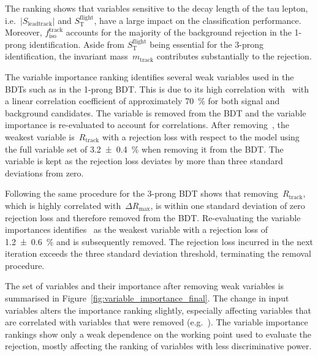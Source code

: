 The ranking shows that variables sensitive to the decay length of the tau
lepton, i.e.\ $|S_\text{leadtrack}|$ and $S_\text{T}^\text{flight}$, have a
large impact on the classification performance. Moreover,
$f_\text{iso}^\text{track}$ accounts for the majority of the background
rejection in the 1-prong identification. Aside from $S_\text{T}^\text{flight}$
being essential for the 3-prong identification, the invariant
mass~$m_\text{track}$ contributes substantially to the rejection.

The variable importance ranking identifies several weak variables used in the
BDTs such as  in the 1-prong BDT. This is
due to its high correlation
with~ with a linear correlation
coefficient of approximately \SI{70}{\percent} for both signal and background
\tauhadvis candidates. The variable is removed from the BDT and the variable
importance is re-evaluated to account for correlations. After
removing~, the weakest variable
is~$R_\text{track}$ with a rejection loss with respect to the model using the
full variable set of \SI{3.2 +- 0.4}{\percent} when removing it from the BDT.
The variable is kept as the rejection loss deviates by more than three standard
deviations from zero.

Following the same procedure for the 3-prong BDT shows that
removing~$R_\text{track}$, which is highly correlated
with~$\Delta R_\text{max}$, is within one standard deviation of zero rejection
loss and therefore removed from the BDT. Re-evaluating the variable importances
identifies~ as the weakest variable with a
rejection loss of \SI{1.2 +- 0.6}{\percent} and is subsequently removed. The
rejection loss incurred in the next iteration exceeds the three standard
deviation threshold, terminating the removal procedure.

The set of variables and their importance after removing weak variables is
summarised in Figure~\ref{fig:variable_importance_final}. The change in input
variables alters the importance ranking slightly, especially affecting variables
that are correlated with variables that were removed (e.g.\
). The variable importance
rankings show only a weak dependence on the working point used to evaluate the
rejection, mostly affecting the ranking of variables with less discriminative
power.


